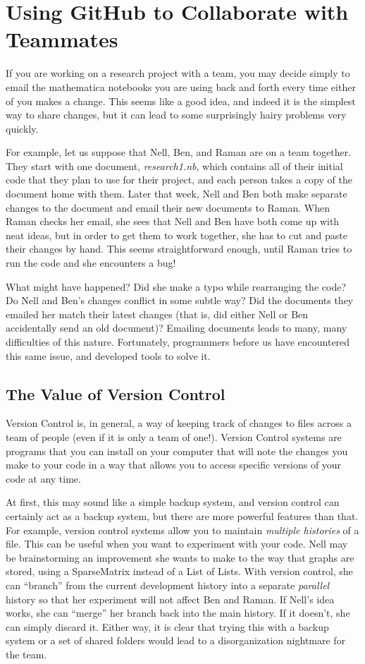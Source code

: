 \chapter{Using GitHub to Collaborate with Teammates}
\label{chap:GitHub}

If you are working on a research project with a team, you may decide simply to email the mathematica notebooks you are using back and forth every time either of you makes a change. This seems like a good idea, and indeed it is the simplest way to share changes, but it can lead to some surprisingly hairy problems very quickly.

For example, let us suppose that Nell, Ben, and Raman are on a team together. They start with one document, \emph{research1.nb}, which contains all of their initial code that they plan to use for their project, and each person takes a copy of the document home with them. Later that week, Nell and Ben both make separate changes to the document and email their new documents to Raman. When Raman checks her email, she sees that Nell and Ben have both come up with neat ideas, but in order to get them to work together, she has to cut and paste their changes by hand. This seems straightforward enough, until Raman tries to run the code and she encounters a bug!

What might have happened? Did she make a typo while rearranging the code? Do Nell and Ben's changes conflict in some subtle way? Did the documents they emailed her match their latest changes (that is, did either Nell or Ben accidentally send an old document)? Emailing documents leads to many, many difficulties of this nature. Fortunately, programmers before us have encountered this same issue, and developed tools to solve it.

\section{The Value of Version Control}

Version Control is, in general, a way of keeping track of changes to files across a team of people (even if it is only a team of one!). Version Control systems are programs that you can install on your computer that will note the changes you make to your code in a way that allows you to access specific versions of your code at any time.

At first, this may sound like a simple backup system, and version control can certainly act as a backup system, but there are more powerful features than that. For example, version control systems allow you to maintain \emph{multiple histories} of a file. This can be useful when you want to experiment with your code. Nell may be brainstorming an improvement she wants to make to the way that graphs are stored, using a SparseMatrix instead of a List of Lists. With version control, she can ``branch'' from the current development history into a separate \emph{parallel} history so that her experiment will not affect Ben and Raman. If Nell's idea works, she can ``merge'' her branch back into the main history. If it doesn't, she can simply discard it. Either way, it is clear that trying this with a backup system or a set of shared folders would lead to a disorganization nightmare for the team.


